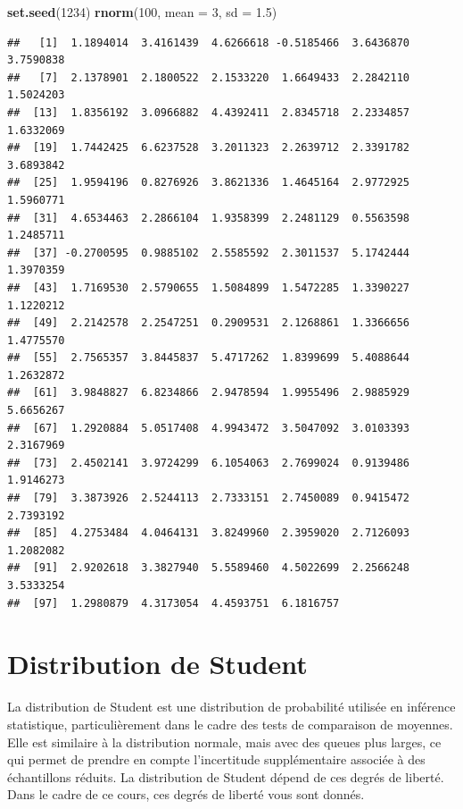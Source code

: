 \documentclass[
]{book}
\newenvironment{Shaded}{\begin{snugshade}}{\end{snugshade}}
\newcommand{\AttributeTok}[1]{\textcolor[rgb]{0.13,0.29,0.53}{#1}}
\newcommand{\DecValTok}[1]{\textcolor[rgb]{0.00,0.00,0.81}{#1}}
\newcommand{\FloatTok}[1]{\textcolor[rgb]{0.00,0.00,0.81}{#1}}
\newcommand{\FunctionTok}[1]{\textcolor[rgb]{0.13,0.29,0.53}{\textbf{#1}}}
\newcommand{\NormalTok}[1]{#1}
\begin{document}
\begin{Shaded}
\begin{Highlighting}[]
\FunctionTok{set.seed}\NormalTok{(}\DecValTok{1234}\NormalTok{)  }
\FunctionTok{rnorm}\NormalTok{(}\DecValTok{100}\NormalTok{, }\AttributeTok{mean =} \DecValTok{3}\NormalTok{, }\AttributeTok{sd =} \FloatTok{1.5}\NormalTok{) }
\end{Highlighting}
\end{Shaded}

\begin{verbatim}
##   [1]  1.1894014  3.4161439  4.6266618 -0.5185466  3.6436870  3.7590838
##   [7]  2.1378901  2.1800522  2.1533220  1.6649433  2.2842110  1.5024203
##  [13]  1.8356192  3.0966882  4.4392411  2.8345718  2.2334857  1.6332069
##  [19]  1.7442425  6.6237528  3.2011323  2.2639712  2.3391782  3.6893842
##  [25]  1.9594196  0.8276926  3.8621336  1.4645164  2.9772925  1.5960771
##  [31]  4.6534463  2.2866104  1.9358399  2.2481129  0.5563598  1.2485711
##  [37] -0.2700595  0.9885102  2.5585592  2.3011537  5.1742444  1.3970359
##  [43]  1.7169530  2.5790655  1.5084899  1.5472285  1.3390227  1.1220212
##  [49]  2.2142578  2.2547251  0.2909531  2.1268861  1.3366656  1.4775570
##  [55]  2.7565357  3.8445837  5.4717262  1.8399699  5.4088644  1.2632872
##  [61]  3.9848827  6.8234866  2.9478594  1.9955496  2.9885929  5.6656267
##  [67]  1.2920884  5.0517408  4.9943472  3.5047092  3.0103393  2.3167969
##  [73]  2.4502141  3.9724299  6.1054063  2.7699024  0.9139486  1.9146273
##  [79]  3.3873926  2.5244113  2.7333151  2.7450089  0.9415472  2.7393192
##  [85]  4.2753484  4.0464131  3.8249960  2.3959020  2.7126093  1.2082082
##  [91]  2.9202618  3.3827940  5.5589460  4.5022699  2.2566248  3.5333254
##  [97]  1.2980879  4.3173054  4.4593751  6.1816757
\end{verbatim}

\section{Distribution de Student}\label{distribution-de-student}

La distribution de Student est une distribution de probabilité utilisée en inférence statistique, particulièrement dans le cadre des tests de comparaison de moyennes. Elle est similaire à la distribution normale, mais avec des queues plus larges, ce qui permet de prendre en compte l'incertitude supplémentaire associée à des échantillons réduits. La distribution de Student dépend de ces degrés de liberté. Dans le cadre de ce cours, ces degrés de liberté vous sont donnés.
\end{document}
